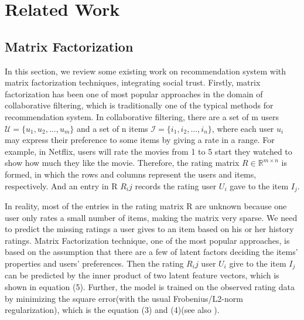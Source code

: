 \section{Related Work}
\subsection{Matrix Factorization}
In this section, we review some existing work on recommendation system with matrix factorization techniques, integrating social trust. Firstly, matrix factorization has been one of most popular approaches in the domain of collaborative filtering, which is traditionally one of the typical methods for recommendation system. In collaborative filtering, there are a set of m users $\mathcal{U} = \{u_1,u_2,...,u_m\}$ and a set of n items $\mathcal{I} = \{i_1,i_2,...,i_n\}$, where each user $u_i$ may express their preference to some items by giving a rate in a range. For example, in Netflix, users will rate the movies from 1 to 5 start they watched to show how much they like the movie. Therefore, the rating matrix $R \in \mathbb{R}^{m \times n}$ is formed, in which the rows and columns represent the users and items, respectively. And an entry in R $R_ij$ records the rating user $U_i$ gave to the item $I_j$. 

In reality, most of the entries in the rating matrix R are unknown because one user only rates a small number of items, making the matrix very sparse. We need to predict the missing ratings a user gives to an item based on his or her history ratings. Matrix Factorization technique, one of the most popular approaches, is based on the assumption that there are a few of latent factors deciding the items' properties and users' preferences. Then the rating $R_ij$ user $U_i$ give to the item $I_j$ can be predicted by the inner product of two latent feature vectors, which is shown in equation (5). Further, the model is trained on the observed rating data by minimizing the square error(with the usual Frobenius/L2-norm regularization), which is the equation (3) and (4)(see also \cite{koren2009matrix}).

